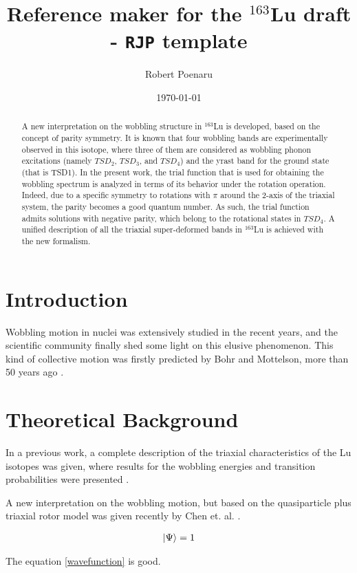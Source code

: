 \documentclass[12pt, oneside]{article}   	%
\title{Reference maker for the $^{163}$Lu draft - \texttt{RJP} template}
\author{Robert Poenaru}
\date{\today}							%
\begin{document}
\maketitle

\begin{abstract}
A new interpretation on the wobbling structure in $^{163}$Lu is developed, based on the concept of parity symmetry. It is known that four wobbling bands are experimentally observed in this isotope, where three of them are considered as wobbling phonon excitations (namely $TSD_2$, $TSD_3$, and $TSD_4$) and the yrast band for the ground state (that is TSD1). In the present work, the trial function that is used for obtaining the wobbling spectrum is analyzed in terms of its behavior under the rotation operation. Indeed, due to a specific symmetry to rotations with $\pi$ around the 2-axis of the triaxial system, the parity becomes a good quantum number. As such, the trial function admits solutions with negative parity, which belong to the rotational states in $TSD_4$. A unified description of all the triaxial super-deformed bands in $^{163}$Lu is achieved with the new formalism.
\end{abstract}

\section{Introduction}
Wobbling motion in nuclei was extensively studied in the recent years, and the scientific community finally shed some light on this elusive phenomenon. This kind of collective motion was firstly predicted by Bohr and Mottelson, more than 50 years ago \cite{bohr1998nuclear}.

\section{Theoretical Background}

In a previous work, a complete description of the triaxial characteristics of the Lu isotopes was given, where results for the wobbling energies and transition probabilities were presented \cite{raduta2018wobbling}.

A new interpretation on the wobbling motion, but based on the quasiparticle plus triaxial rotor model was given recently by Chen et. al. \cite{chen2020interpretation}.

\begin{align}
    \ket{\Psi}=1
    \label{wavefunction}
\end{align}

The equation \ref{wavefunction} is good.


\end{document}
